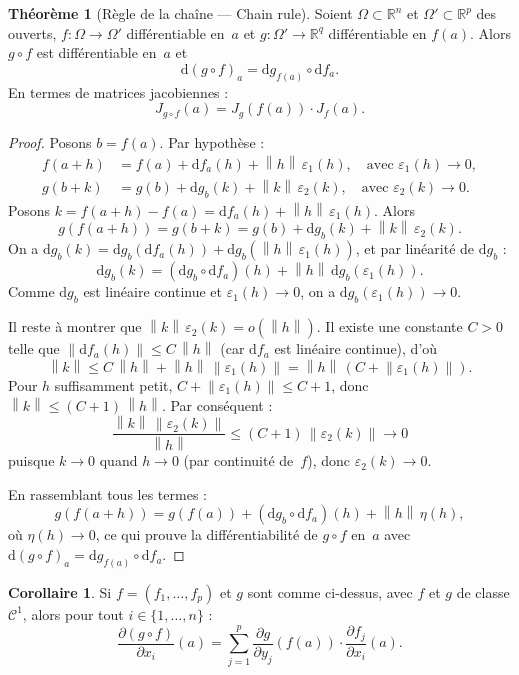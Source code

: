 \documentclass[12pt,a4paper,openany]{book}
\theoremstyle{definition}
\newtheorem{theoreme}{Théorème}[chapter]
\newtheorem{corollaire}{Corollaire}[chapter]
\newcommand{\R}{\mathbb{R}}
\newcommand{\eps}{\varepsilon}
\newcommand{\norm}[1]{\left\lVert #1 \right\rVert}
\newcommand{\dd}{\mathrm{d}}
\begin{document}
\begin{theoreme}[Règle de la chaîne --- Chain rule]
  \label{thm:chain-rule}
  Soient $\Omega \subset \R^n$ et $\Omega' \subset \R^p$ des ouverts, $f \colon \Omega \to \Omega'$ différentiable en~$a$ et $g \colon \Omega' \to \R^q$ différentiable en $f(a)$. Alors $g \circ f$ est différentiable en~$a$ et
  \[
    \dd(g \circ f)_a = \dd g_{f(a)} \circ \dd f_a.
  \]
  En termes de matrices jacobiennes :
  \[
    J_{g \circ f}(a) = J_g(f(a)) \cdot J_f(a).
  \]
\end{theoreme}

\begin{proof}
  Posons $b = f(a)$. Par hypothèse :
  \begin{align*}
    f(a + h) &= f(a) + \dd f_a(h) + \norm{h}\,\eps_1(h), \quad \text{avec } \eps_1(h) \to 0, \\
    g(b + k) &= g(b) + \dd g_b(k) + \norm{k}\,\eps_2(k), \quad \text{avec } \eps_2(k) \to 0.
  \end{align*}
  Posons $k = f(a+h) - f(a) = \dd f_a(h) + \norm{h}\,\eps_1(h)$. Alors
  \[
    g(f(a+h)) = g(b + k) = g(b) + \dd g_b(k) + \norm{k}\,\eps_2(k).
  \]
  On a $\dd g_b(k) = \dd g_b(\dd f_a(h)) + \dd g_b(\norm{h}\,\eps_1(h))$, et par linéarité de $\dd g_b$ :
  \[
    \dd g_b(k) = (\dd g_b \circ \dd f_a)(h) + \norm{h}\,\dd g_b(\eps_1(h)).
  \]
  Comme $\dd g_b$ est linéaire continue et $\eps_1(h) \to 0$, on a $\dd g_b(\eps_1(h)) \to 0$.

  Il reste à montrer que $\norm{k}\,\eps_2(k) = o(\norm{h})$. Il existe une constante $C > 0$ telle que $\norm{\dd f_a(h)} \leqslant C\,\norm{h}$ (car $\dd f_a$ est linéaire continue), d'où
  \[
    \norm{k} \leqslant C\,\norm{h} + \norm{h}\,\norm{\eps_1(h)} = \norm{h}\,(C + \norm{\eps_1(h)}).
  \]
  Pour $h$ suffisamment petit, $C + \norm{\eps_1(h)} \leqslant C + 1$, donc $\norm{k} \leqslant (C+1)\,\norm{h}$. Par conséquent :
  \[
    \frac{\norm{k}\,\norm{\eps_2(k)}}{\norm{h}} \leqslant (C+1)\,\norm{\eps_2(k)} \to 0
  \]
  puisque $k \to 0$ quand $h \to 0$ (par continuité de~$f$), donc $\eps_2(k) \to 0$.

  En rassemblant tous les termes :
  \[
    g(f(a+h)) = g(f(a)) + (\dd g_b \circ \dd f_a)(h) + \norm{h}\,\eta(h),
  \]
  où $\eta(h) \to 0$, ce qui prouve la différentiabilité de $g \circ f$ en~$a$ avec $\dd(g \circ f)_a = \dd g_{f(a)} \circ \dd f_a$.
\end{proof}

\begin{corollaire}
  \label{cor:chain-rule-partielles}
  Si $f = (f_1, \ldots, f_p)$ et $g$ sont comme ci-dessus, avec $f$ et $g$ de classe $\mathcal{C}^1$, alors pour tout $i \in \{1, \ldots, n\}$ :
  \[
    \frac{\partial (g \circ f)}{\partial x_i}(a)
    = \sum_{j=1}^{p} \frac{\partial g}{\partial y_j}(f(a)) \cdot \frac{\partial f_j}{\partial x_i}(a).
  \]
\end{corollaire}
\end{document}
